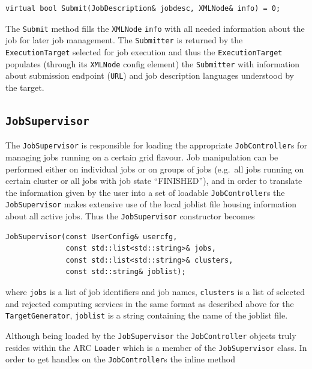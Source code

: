 \documentclass{book}
\newcommand{\ExecutionTarget}{\texttt{ExecutionTarget}}
\newcommand{\JobController}{\texttt{JobController}}
\newcommand{\JobSupervisor}{\texttt{JobSupervisor}}
\newcommand{\Loader}{\texttt{Loader}}
\newcommand{\TargetGenerator}{\texttt{TargetGenerator}}
\newcommand{\Submitter}{\texttt{Submitter}}
\newcommand{\URL}{\texttt{URL}}
\newcommand{\XMLNode}{\texttt{XMLNode}}
\begin{document}
\begin{shaded}
\begin{verbatim}
virtual bool Submit(JobDescription& jobdesc, XMLNode& info) = 0;
\end{verbatim}
\end{shaded}

The \texttt{Submit} method fills the {\XMLNode} \texttt{info} with all
needed information about the job for later job management. The
{\Submitter} is returned by the {\ExecutionTarget} selected for job
execution and thus the {\ExecutionTarget} populates (through its
{\XMLNode} config element) the {\Submitter} with information about
submission endpoint ({\URL}) and job description languages understood
by the target.

\subsection{{\JobSupervisor}}

The {\JobSupervisor} is responsible for loading the appropriate
{\JobController}s for managing jobs running on a certain grid
flavour. Job manipulation can be performed either on individual jobs
or on groups of jobs (e.g.\ all jobs running on certain cluster or all
jobs with job state ``FINISHED''), and in order to translate the
information given by the user into a set of loadable {\JobController}s
the {\JobSupervisor} makes extensive use of the local joblist file
housing information about all active jobs. Thus the {\JobSupervisor}
constructor becomes

\begin{shaded}
\begin{verbatim}
JobSupervisor(const UserConfig& usercfg,
              const std::list<std::string>& jobs,
              const std::list<std::string>& clusters,
              const std::string& joblist);
\end{verbatim}
\end{shaded}

where \texttt{jobs} is a list of job identifiers and job names,
\texttt{clusters} is a list of selected and rejected computing
services in the same format as described above for the
{\TargetGenerator}, \texttt{joblist} is a string containing the name
of the joblist file.

Although being loaded by the {\JobSupervisor} the {\JobController}
objects truly resides within the ARC {\Loader} which is a member of
the {\JobSupervisor} class. In order to get handles on the
{\JobController}s the inline method
\end{document}
